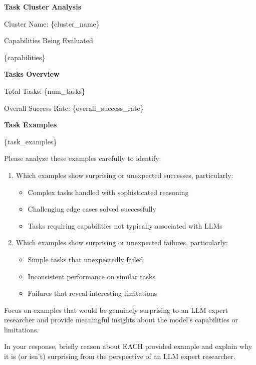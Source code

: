 \begin{tcolorbox}[breakable,boxrule=0.5pt,sharp corners,fontupper=\small,
colback=orange!5!white, colframe=orange!80!black, title={Example Selection Prompt}]
\textbf{Task Cluster Analysis}

Cluster Name: \{cluster\_name\}

Capabilities Being Evaluated

\{capabilities\}

\textbf{Tasks Overview}

Total Tasks: \{num\_tasks\}

Overall Success Rate: \{overall\_success\_rate\}

\textbf{Task Examples}

\{task\_examples\}

Please analyze these examples carefully to identify:
\begin{enumerate}[leftmargin=2em]
    \item Which examples show surprising or unexpected successes, particularly:
    \begin{itemize}[leftmargin=1.25em]
        \item Complex tasks handled with sophisticated reasoning
        \item Challenging edge cases solved successfully
        \item Tasks requiring capabilities not typically associated with LLMs
    \end{itemize}
    \item Which examples show surprising or unexpected failures, particularly:
    \begin{itemize}[leftmargin=1.25em]
        \item Simple tasks that unexpectedly failed
        \item Inconsistent performance on similar tasks
        \item Failures that reveal interesting limitations
    \end{itemize}
\end{enumerate}

Focus on examples that would be genuinely surprising to an LLM expert researcher and provide meaningful insights about the model's capabilities or limitations.

In your response, briefly reason about EACH provided example and explain why it is (or isn't) surprising from the perspective of an LLM expert researcher.
\end{tcolorbox}

